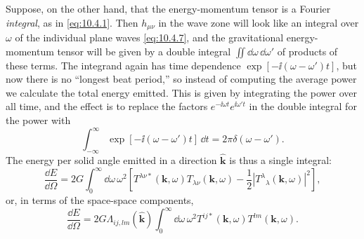Suppose, on the other hand, that the energy-momentum tensor is a Fourier
\emph{integral}, as in \eqref{eq:10.4.1}. Then \(h_{\mu\nu}\) in the wave
zone will look like an integral over \(\omega\) of the individual plane
waves \eqref{eq:10.4.7}, and the gravitational energy-momentum tensor will
be given by a double integral \(\iint \dd\omega\,\dd\omega'\) of products of
these terms. The integrand again has time dependence
\(\exp[-\ii(\omega-\omega')t]\), but now there is no ``longest beat
period,'' so instead of computing the average power we calculate the total
energy emitted. This is given by integrating the power over all time, and
the effect is to replace the factors \(e^{-\ii\omega t}e^{\ii\omega't}\) in
the double integral for the power with
\[
  \int_{-\infty}^{\infty}
  \exp[-\ii(\omega-\omega')t]\,\dd t
  =
  2\pi\delta(\omega-\omega').
\]
The energy per solid angle emitted in a direction
\(\widehat{\mathbf{k}}\) is thus a single integral:
\begin{equation}
  \frac{\dd E}{\dd\Omega}
  =
  2G\int_0^\infty \dd\omega\,\omega^2
  \left[
    T^{\lambda\nu*}(\mathbf{k},\omega)
    T_{\lambda\nu}(\mathbf{k},\omega)
    -\frac12\left|T^\lambda{}_\lambda(\mathbf{k},\omega)\right|^2
  \right],
  \tag{10.4.16}\label{eq:10.4.16}
\end{equation}
or, in terms of the space-space components,
\[
  \frac{\dd E}{\dd\Omega}
  =
  2G\Lambda_{ij,lm}(\widehat{\mathbf{k}})
  \int_0^\infty \dd\omega\,\omega^2
  T^{ij*}(\mathbf{k},\omega)T^{lm}(\mathbf{k},\omega).
\]

